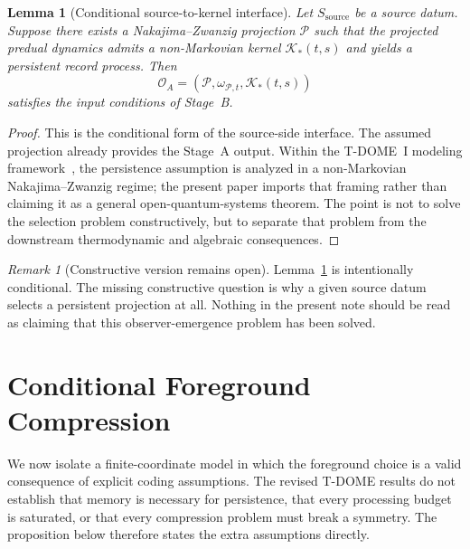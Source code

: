 \documentclass[12pt]{article}
\newtheorem{lemma}[theorem]{Lemma}
\theoremstyle{definition}
\theoremstyle{remark}
\newtheorem{remark}[theorem]{Remark}
\begin{document}
\begin{lemma}[Conditional source-to-kernel interface]\label{lem:A}
Let \(S_{\mathrm{source}}\) be a source datum. Suppose there exists a
Nakajima--Zwanzig projection \(\mathcal P\) such that the projected
predual dynamics admits a non-Markovian kernel \(\mathcal K_*(t,s)\)
and yields a persistent record process. Then
\[
\mathcal O_A=(\mathcal P,\omega_{\mathcal P,t},\mathcal K_*(t,s))
\]
satisfies the input conditions of Stage~B.
\end{lemma}

\begin{proof}
This is the conditional form of the source-side interface. The assumed
projection already provides the Stage~A output. Within the T-DOME~I
modeling framework~\cite{TDOMEI}, the persistence assumption is analyzed
in a non-Markovian Nakajima--Zwanzig regime; the present paper imports
that framing rather than claiming it as a general open-quantum-systems
theorem. The point is not to solve the selection problem
constructively, but to separate that problem from the downstream
thermodynamic and algebraic consequences.
\end{proof}

\begin{remark}[Constructive version remains open]
Lemma~\ref{lem:A} is intentionally conditional. The missing constructive
question is why a given source datum selects a persistent projection at
all. Nothing in the present note should be read as claiming that this
observer-emergence problem has been solved.
\end{remark}

\section{Conditional Foreground Compression}\label{sec:budget}

We now isolate a finite-coordinate model in which the foreground choice
is a valid consequence of explicit coding assumptions. The revised
T-DOME results do not establish that memory is necessary for persistence,
that every processing budget is saturated, or that every compression
problem must break a symmetry. The proposition below therefore states
the extra assumptions directly.
\end{document}
